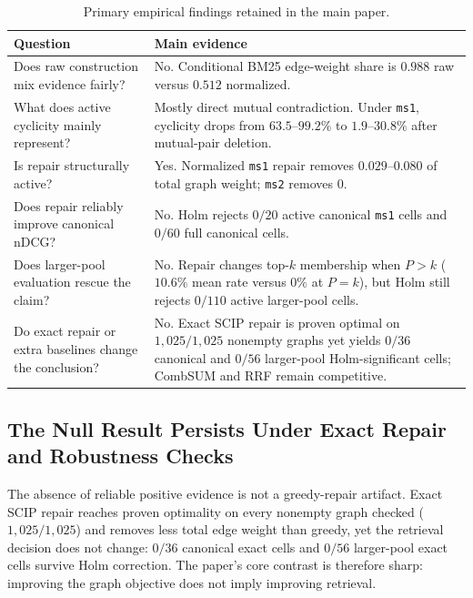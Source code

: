 \documentclass[acmsmall,anonymous,review]{acmart}
\begin{document}
\begin{table}[t]
  \caption{Primary empirical findings retained in the main paper.}
  \label{tab:primary-findings}
  \scriptsize
  \begin{tabular}{p{3.0cm}p{6.0cm}}
    \toprule
    Question & Main evidence \\
    \midrule
    Does raw construction mix evidence fairly? & No. Conditional BM25 edge-weight share is $0.988$ raw versus $0.512$ normalized. \\
    What does active cyclicity mainly represent? & Mostly direct mutual contradiction. Under \texttt{ms1}, cyclicity drops from $63.5$--$99.2\%$ to $1.9$--$30.8\%$ after mutual-pair deletion. \\
    Is repair structurally active? & Yes. Normalized \texttt{ms1} repair removes $0.029$--$0.080$ of total graph weight; \texttt{ms2} removes $0$. \\
    Does repair reliably improve canonical nDCG? & No. Holm rejects $0/20$ active canonical \texttt{ms1} cells and $0/60$ full canonical cells. \\
    Does larger-pool evaluation rescue the claim? & No. Repair changes top-$k$ membership when $P>k$ ($10.6\%$ mean rate versus $0\%$ at $P=k$), but Holm still rejects $0/110$ active larger-pool cells. \\
    Do exact repair or extra baselines change the conclusion? & No. Exact SCIP repair is proven optimal on $1{,}025/1{,}025$ nonempty graphs yet yields $0/36$ canonical and $0/56$ larger-pool Holm-significant cells; CombSUM and RRF remain competitive. \\
    \bottomrule
  \end{tabular}
\end{table}

\subsection{The Null Result Persists Under Exact Repair and Robustness Checks}
\label{sec:robustness-results}

The absence of reliable positive evidence is not a greedy-repair artifact.
Exact SCIP repair reaches proven optimality on every nonempty graph checked
($1{,}025/1{,}025$) and removes less total edge weight than greedy, yet the
retrieval decision does not change: $0/36$ canonical exact cells and $0/56$
larger-pool exact cells survive Holm correction. The paper's core contrast
is therefore sharp: improving the graph objective does not imply improving
retrieval.
\end{document}
